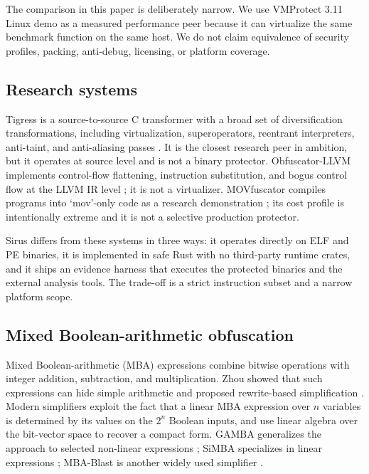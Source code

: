 The comparison in this paper is deliberately narrow. We use VMProtect 3.11 Linux
demo as a measured performance peer because it can virtualize the same benchmark
function on the same host. We do not claim equivalence of security profiles,
packing, anti-debug, licensing, or platform coverage.

\subsection{Research systems}

Tigress is a source-to-source C transformer with a broad set of diversification
transformations, including virtualization, superoperators, reentrant interpreters,
anti-taint, and anti-aliasing passes \cite{tigress}. It is the closest research
peer in ambition, but it operates at source level and is not a binary protector.
Obfuscator-LLVM implements control-flow flattening, instruction substitution, and
bogus control flow at the LLVM IR level \cite{junod2015ollvm}; it is not a
virtualizer. MOVfuscator compiles programs into `mov'-only code as a research
demonstration \cite{domas2015movfuscator}; its cost profile is intentionally
extreme and it is not a selective production protector.

Sirus differs from these systems in three ways: it operates directly on ELF and
PE binaries, it is implemented in safe Rust with no third-party runtime crates,
and it ships an evidence harness that executes the protected binaries and the
external analysis tools. The trade-off is a strict instruction subset and a
narrow platform scope.

\subsection{Mixed Boolean-arithmetic obfuscation}

Mixed Boolean-arithmetic (MBA) expressions combine bitwise operations with
integer addition, subtraction, and multiplication. Zhou \etal{} showed that such
expressions can hide simple arithmetic and proposed rewrite-based
simplification \cite{zhou2007}. Modern simplifiers exploit the fact that a linear
MBA expression over $n$ variables is determined by its values on the $2^n$
Boolean inputs, and use linear algebra over the bit-vector space to recover a
compact form. GAMBA generalizes the approach to selected non-linear expressions
\cite{reichenwallner2023gamba}; SiMBA specializes in linear expressions
\cite{reichenwallner2022simba}; MBA-Blast is another widely used
simplifier \cite{mba_blast}.

